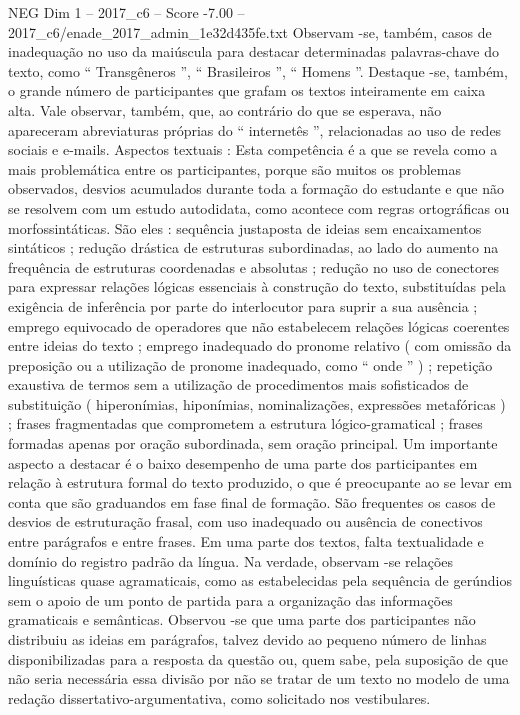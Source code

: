 \begin{textsample}{NEG Dim 1 – 2017\_c6 – Score -7.00 – 2017\_c6/enade\_2017\_admin\_1e32d435fe.txt}
Observam -se, também, casos de inadequação no uso da maiúscula para destacar determinadas palavras-chave do texto, como “ Transgêneros ”, “ Brasileiros ”, “ Homens ”.
Destaque -se, também, o grande número de participantes que grafam os textos inteiramente em caixa alta.
Vale observar, também, que, ao contrário do que se esperava, não apareceram abreviaturas próprias do “ internetês ”, relacionadas ao uso de redes sociais e e-mails.
Aspectos textuais : Esta competência é a que se revela como a mais problemática entre os participantes, porque são muitos os problemas observados, desvios acumulados durante toda a formação do estudante e que não se resolvem com um estudo autodidata, como acontece com regras ortográficas ou morfossintáticas.
São eles : sequência justaposta de ideias sem encaixamentos sintáticos ; redução drástica de estruturas subordinadas, ao lado do aumento na frequência de estruturas coordenadas e absolutas ; redução no uso de conectores para expressar relações lógicas essenciais à construção do texto, substituídas pela exigência de inferência por parte do interlocutor para suprir a sua ausência ; emprego equivocado de operadores que não estabelecem relações lógicas coerentes entre ideias do texto ; emprego inadequado do pronome relativo ( com omissão da preposição ou a utilização de pronome inadequado, como “ onde ” ) ; repetição exaustiva de termos sem a utilização de procedimentos mais sofisticados de substituição ( hiperonímias, hiponímias, nominalizações, expressões metafóricas ) ; frases fragmentadas que comprometem a estrutura lógico-gramatical ; frases formadas apenas por oração subordinada, sem oração principal.
Um importante aspecto a destacar é o baixo desempenho de uma parte dos participantes em relação à estrutura formal do texto produzido, o que é preocupante ao se levar em conta que são graduandos em fase final de formação.
São frequentes os casos de desvios de estruturação frasal, com uso inadequado ou ausência de conectivos entre parágrafos e entre frases.
Em uma parte dos textos, falta textualidade e domínio do registro padrão da língua.
Na verdade, observam -se relações linguísticas quase agramaticais, como as estabelecidas pela sequência de gerúndios sem o apoio de um ponto de partida para a organização das informações gramaticais e semânticas.
Observou -se que uma parte dos participantes não distribuiu as ideias em parágrafos, talvez devido ao pequeno número de linhas disponibilizadas para a resposta da questão ou, quem sabe, pela suposição de que não seria necessária essa divisão por não se tratar de um texto no modelo de uma redação dissertativo-argumentativa, como solicitado nos vestibulares.

\end{textsample}
